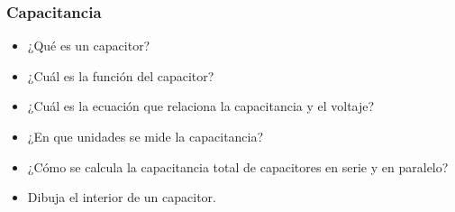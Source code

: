 \documentclass[handout]{beamer}
\begin{document}
\begin{frame}
  \frametitle{Capacitancia}
  \begin{itemize}
  \item ¿Qué es un capacitor?
  \item ¿Cuál es la función del capacitor?
  \item ¿Cuál es la ecuación que relaciona la capacitancia y el voltaje?
  \item ¿En que unidades se mide la capacitancia?
  \item ¿Cómo se calcula la capacitancia total de capacitores en serie y en paralelo?
  \item Dibuja el interior de un capacitor.
  \end{itemize}
\end{frame}
\end{document}
